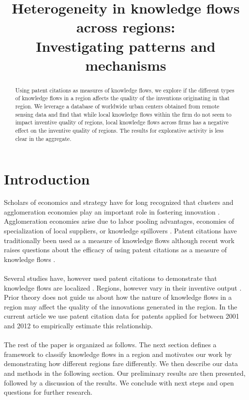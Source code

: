 \documentclass[10pt,letterpaper]{article}
\begin{document}
\title{Heterogeneity in knowledge flows across regions:\\ Investigating patterns and mechanisms}
\date{\vspace{-5ex}}

\maketitle
\thispagestyle{empty}
\begin{abstract}
\noindent Using patent citations as measures of knowledge flows, we explore if the different types of knowledge flows in a region affects the quality of the inventions originating in that region. We leverage a database of worldwide urban centers  obtained from remote sensing data and find that  while local knowledge flows within the firm do not seem to impact inventive quality of regions, local knowledge flows across firms has a negative effect on the inventive quality of regions. The results for explorative activity is less clear in the aggregate.
\end{abstract}

\section*{Introduction}
Scholars of economics and strategy have for long recognized that clusters and agglomeration economies play an important role in fostering innovation \citep{Marshall1890, Porter1990}. Agglomeration economies arise due to labor pooling advantages, economies of specialization of local suppliers, or knowledge spillovers \citep{Porter1990, Krugman1991}. Patent citations have traditionally been used as a  measure of knowledge flows \citep{Jaffe1993} although recent work raises questions about the efficacy of using patent citations as a measure of knowledge flows \citep{Arora2017}. 
\\\\
Several studies have, however used patent citations to demonstrate that knowledge flows are localized \citep{Jaffe1993, Almeida1999, Alcacer2006a}. Regions, however vary in their inventive output \citep{Agrawal2014}. Prior theory does not guide us about how the nature of knowledge flows in a region may affect the quality of the innovations generated in the region. In the current article we use patent citation data for patents applied for between 2001 and 2012 to empirically estimate this relationship. 
\\\\
The rest of the paper is organized as follows. The next section defines a framework to classify knowledge flows in a region and motivates our work by demonstrating how different regions fare differently. We then describe our data and methods in the following section. Our preliminary results are then presented, followed by a discussion of the results. We conclude with next steps and open questions for further research.
\end{document}
